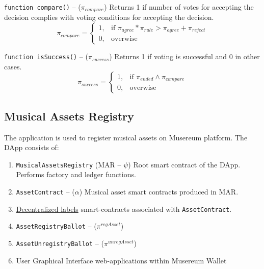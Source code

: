 \documentclass[12pt]{report}
\def\code#1{\colorbox{light-gray}{\texttt{#1}}}
\begin{document}
\code{function compare()} – ($\pi_{compare}$)\hfill\null\linebreak
Returns 1 if number of votes for accepting the decision complies with voting conditions for accepting the decision.
\begin{equation}
\pi_{compare} = \begin{cases}
	1, & \text{if }\pi_{agree} * \pi_{rule} > \pi_{agree} + \pi_{reject} \\
	0, & \text{overwise}
\end{cases}
\end{equation}

\code{function isSuccess()} – ($\pi_{success}$)\hfill\null\linebreak
Returns 1 if voting is successful and 0 in other cases.
\begin{equation}
\pi_{success} = \begin{cases}
	1, & \text{if } \pi_{ended} \wedge \pi_{compare} \\
	0, & \text{overwise }
\end{cases}
\end{equation}
\subsection{Musical Assets Registry}
\label{tech-apps-assets}
The application is used to register musical assets on Musereum platform. The DApp consists of:
\begin{enumerate}
	\item \code{MusicalAssetsRegistry} (MAR – $\psi$)\hfill\null\linebreak
	Root	smart contract of the DApp. Performs factory and ledger functions.
	\item \code{AssetContract} – ($\alpha$)\hfill\null\linebreak
	Musical asset smart contracts produced in MAR.
	\item \hyperref[tech-apps-dal]{Decentralized labels} smart-contracts associated with \code{AssetContract}.
	\item \code{AssetRegistryBallot} – ($\pi^{regAsset}$)
	\item \code{AssetUnregistryBallot} – ($\pi^{unregAsset}$)
	\item User Graphical Interface \hfill\null\linebreak
	web-applications within Musereum Wallet
\end{enumerate}
\end{document}
